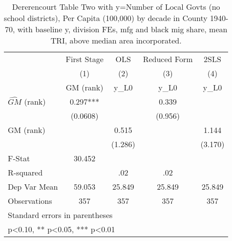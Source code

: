 \begin{table}[htbp]\centering
\def\sym#1{\ifmmode^{#1}\else\(^{#1}\)\fi}
\caption{Dererencourt Table Two with y=Number of Local Govts (no school districts), Per Capita (100,000) by decade in County 1940-70, with baseline y, division FEs, mfg and black mig share, mean TRI, above median area incorporated.}
\begin{tabular}{l*{4}{c}}
\toprule
                    & First Stage   &         OLS   &Reduced Form   &        2SLS   \\
                    &\multicolumn{1}{c}{(1)}&\multicolumn{1}{c}{(2)}&\multicolumn{1}{c}{(3)}&\multicolumn{1}{c}{(4)}\\
                    &\multicolumn{1}{c}{GM  (rank)}&\multicolumn{1}{c}{y\_L0}&\multicolumn{1}{c}{y\_L0}&\multicolumn{1}{c}{y\_L0}\\
\midrule
$\hat{GM}$ (rank)   &       0.297***&               &       0.339   &               \\
                    &    (0.0608)   &               &     (0.956)   &               \\
\addlinespace
GM  (rank)          &               &       0.515   &               &       1.144   \\
                    &               &     (1.286)   &               &     (3.170)   \\
\midrule
F-Stat              &      30.452   &               &               &               \\
R-squared           &               &         .02   &         .02   &               \\
Dep Var Mean        &      59.053   &      25.849   &      25.849   &      25.849   \\
Observations        &         357   &         357   &         357   &         357   \\
\bottomrule
\multicolumn{5}{l}{\footnotesize Standard errors in parentheses}\\
\multicolumn{5}{l}{\footnotesize * p<0.10, ** p<0.05, *** p<0.01}\\
\end{tabular}
\end{table}
